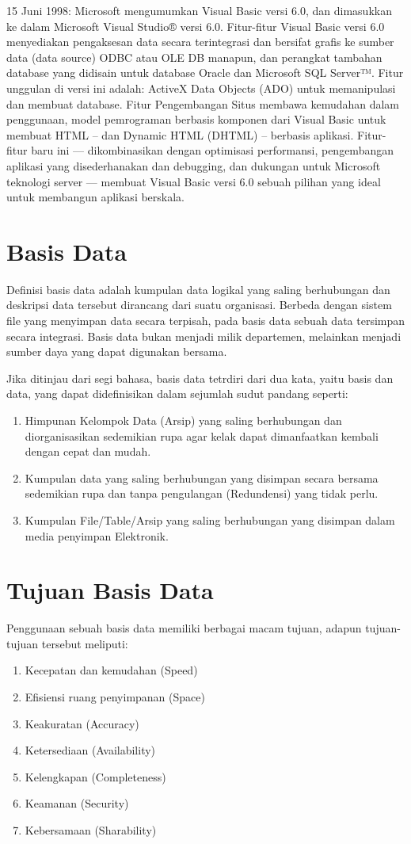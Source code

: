 \documentclass{jtetiproposalskripsi}
\begin{document}
15 Juni 1998: Microsoft mengumumkan Visual Basic versi 6.0, dan dimasukkan ke dalam Microsoft Visual Studio® versi 6.0. Fitur-fitur Visual Basic versi 6.0 menyediakan pengaksesan data secara terintegrasi dan bersifat grafis ke sumber data (data source) ODBC atau OLE DB manapun, dan perangkat tambahan database yang didisain untuk database Oracle dan Microsoft SQL Server™. Fitur unggulan di versi ini adalah: ActiveX Data Objects (ADO) untuk memanipulasi dan membuat database. Fitur Pengembangan Situs membawa kemudahan dalam penggunaan, model pemrograman berbasis komponen dari Visual Basic untuk membuat HTML – dan Dynamic HTML (DHTML) – berbasis aplikasi. Fitur-fitur baru ini — dikombinasikan dengan optimisasi performansi, pengembangan aplikasi yang disederhanakan dan debugging, dan dukungan untuk Microsoft teknologi server — membuat Visual Basic versi 6.0 sebuah pilihan yang ideal untuk membangun aplikasi berskala.


\section{Basis Data}
Definisi basis data adalah kumpulan data logikal yang saling berhubungan dan deskripsi data tersebut dirancang dari suatu organisasi. Berbeda dengan sistem file yang menyimpan data secara terpisah, pada basis data sebuah data tersimpan secara integrasi. Basis data bukan menjadi milik departemen, melainkan menjadi sumber daya yang dapat digunakan bersama. 

Jika ditinjau dari segi bahasa, basis data tetrdiri dari dua kata, yaitu basis dan data, yang dapat didefinisikan dalam sejumlah sudut pandang seperti:
\begin{enumerate}
\item Himpunan Kelompok Data (Arsip) yang saling berhubungan dan diorganisasikan sedemikian rupa agar kelak dapat dimanfaatkan kembali dengan cepat dan mudah.
\item Kumpulan data yang saling berhubungan yang disimpan secara bersama sedemikian rupa dan tanpa pengulangan (Redundensi) yang tidak perlu. 
\item Kumpulan File/Table/Arsip yang saling berhubungan yang disimpan dalam media penyimpan Elektronik.
\end{enumerate}

\section{Tujuan Basis Data}
Penggunaan sebuah basis data memiliki berbagai macam tujuan, adapun tujuan-tujuan tersebut meliputi:
\begin{enumerate}
\item Kecepatan dan kemudahan (Speed) 
\item Efisiensi ruang penyimpanan (Space) 
\item Keakuratan (Accuracy) 
\item Ketersediaan (Availability) 
\item Kelengkapan (Completeness) 
\item Keamanan (Security) 
\item Kebersamaan (Sharability)
\end{enumerate}
\end{document}
